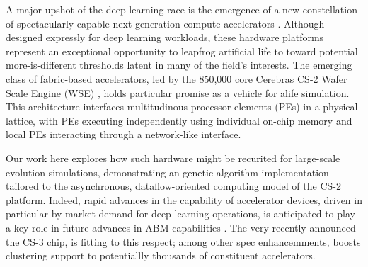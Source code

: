 

A major upshot of the deep learning race is the emergence of a new constellation of spectacularly capable next-generation compute accelerators \citep{zhang2016cambricon,emani2021accelerating,jia2019dissecting,medina2020habana}.
Although designed expressly for deep learning workloads, these hardware platforms represent an exceptional opportunity to leapfrog artificial life to toward potential more-is-different thresholds latent in many of the field's interests.
The emerging class of fabric-based accelerators, led by the 850,000 core Cerebras CS-2 Wafer Scale Engine (WSE) \citep{lauterbach2021path,lie2022cerebras}, holds particular promise as a vehicle for alife simulation.
This architecture interfaces multitudinous processor elements (PEs) in a physical lattice, with PEs executing independently using individual on-chip memory and local PEs interacting through a network-like interface.

Our work here explores how such hardware might be recurited for large-scale evolution simulations, demonstrating an genetic algorithm implementation tailored to the asynchronous, dataflow-oriented computing model of the CS-2 platform.
Indeed, rapid advances in the capability of accelerator devices, driven in particular by market demand for deep learning operations, is anticipated to play a key role in future advances in ABM capabilities \citep{perumalla2022computer}.
The very recently announced the CS-3 chip, is fitting to this respect; among other spec enhancemments, boosts clustering support to potentiallly thousands of constituent accelerators.

